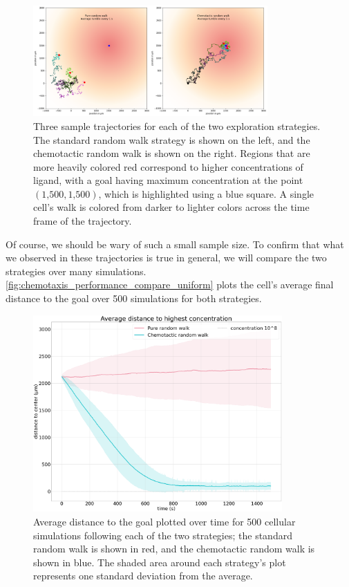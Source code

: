\begin{figure}[h]
\centering
\mySfFamily
\includegraphics[width = 0.8\textwidth]{../images/chemotaxis_traj_compare_uniform.png}
\caption{Three sample trajectories for each of the two exploration strategies. The standard random walk strategy is shown on the left, and the chemotactic random walk is shown on the right. Regions that are more heavily colored red correspond to higher concentrations of ligand, with a goal having maximum concentration at the point $(\text{1,500}, \text{1,500})$, which is highlighted using a blue square. A single cell's walk is colored from darker to lighter colors across the time frame of the trajectory.}
\label{fig:chemotaxis_traj_compare_uniform}
\end{figure}


Of course, we should be wary of such a small sample size. To confirm that what we observed in these trajectories is true in general, we will compare the two strategies over many simulations. \autoref{fig:chemotaxis_performance_compare_uniform} plots the cell's average final distance to the goal over 500 simulations for both strategies.

\begin{figure}[h]
\centering
\mySfFamily
\includegraphics[width = 0.85\textwidth]{../images/chemotaxis_performance_compare_uniform.png}
\caption{Average distance to the goal plotted over time for 500 cellular simulations following each of the two strategies; the standard random walk is shown in red, and the chemotactic random walk is shown in blue. The shaded area around each strategy's plot represents one standard deviation from the average.}
\label{fig:chemotaxis_performance_compare_uniform}
\end{figure}


